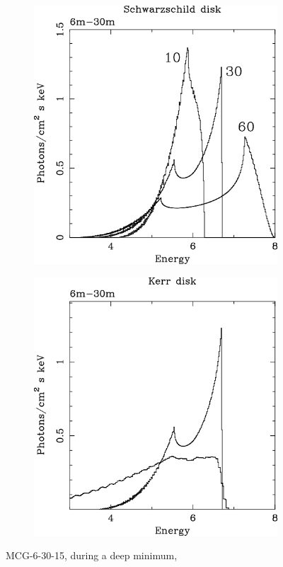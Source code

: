 \documentclass[10pt,a4paper,english]{article}
\begin{document}
\begin{figure}[!ht]
  \begin{subfigure}[t]{0.495\textwidth}
    \includegraphics{figures/fabian2000-2.png}
  \end{subfigure}
  \begin{subfigure}[t]{0.495\textwidth}
    \includegraphics{figures/fabian2000-3.png}
  \end{subfigure}
  \label{fig:scharz_kerr_energy}
  \caption{MCG-6-30-15, during a deep minimum, \cite{Fabian2000}}
\end{figure}
\end{document}
